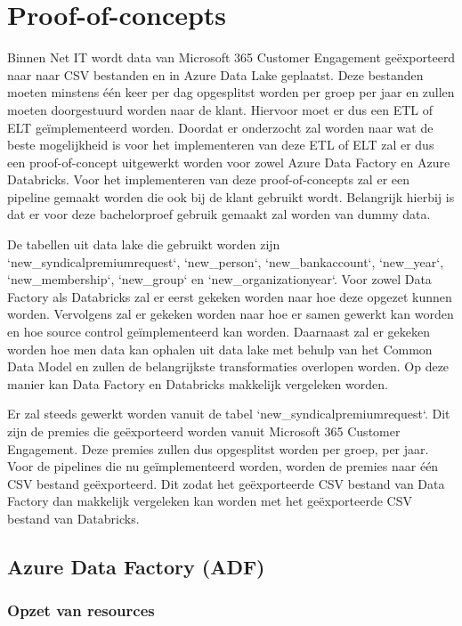 \section{Proof-of-concepts}


Binnen Net IT wordt data van Microsoft 365 Customer Engagement geëxporteerd naar naar CSV bestanden en in Azure Data Lake geplaatst. Deze bestanden moeten minstens één keer per dag opgesplitst worden per groep per jaar en zullen moeten doorgestuurd worden naar de klant. Hiervoor moet er dus een ETL of ELT geïmplementeerd worden. Doordat er onderzocht zal worden naar wat de beste mogelijkheid is voor het implementeren van deze ETL of ELT zal er dus een proof-of-concept uitgewerkt worden voor zowel Azure Data Factory en Azure Databricks. Voor het implementeren van deze proof-of-concepts zal er een pipeline gemaakt worden die ook bij de klant gebruikt wordt. Belangrijk hierbij is dat er voor deze bachelorproef gebruik gemaakt zal worden van dummy data.
    

De tabellen uit data lake die gebruikt worden zijn `new\_syndicalpremiumrequest`, `new\_person`, `new\_bankaccount`, `new\_year`, `new\_membership`, `new\_group` en `new\_organizationyear`. Voor zowel Data Factory als Databricks zal er eerst gekeken worden naar hoe deze opgezet kunnen worden. Vervolgens zal er gekeken worden naar hoe er samen gewerkt kan worden en hoe source control geïmplementeerd kan worden. Daarnaast zal er gekeken worden hoe men data kan ophalen uit data lake met behulp van het Common Data Model en zullen de belangrijkste transformaties overlopen worden. Op deze manier kan Data Factory en Databricks makkelijk vergeleken worden.
    

Er zal steeds gewerkt worden vanuit de tabel `new\_syndicalpremiumrequest`. Dit zijn de premies die geëxporteerd worden vanuit Microsoft 365 Customer Engagement. Deze premies zullen dus opgesplitst worden per groep, per jaar. Voor de pipelines die nu geïmplementeerd worden, worden de premies naar één CSV bestand geëxporteerd. Dit zodat het geëxporteerde CSV bestand van Data Factory dan makkelijk vergeleken kan worden met het geëxporteerde CSV bestand van Databricks.

\subsection{Azure Data Factory (ADF)}

\subsubsection{Opzet van resources}

